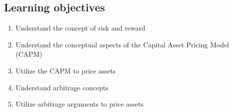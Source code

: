 \subsection{Learning objectives}
\begin{definition}
    \begin{enumerate}
        \item Understand the concept of risk and reward
        \item Understand the conceptual aspects of the Capital Asset Pricing Model (CAPM)
        \item Utilize the CAPM to price assets
        \item Understand arbitrage concepts
        \item Utilize arbitrage arguments to price assets    
    \end{enumerate}
\end{definition}

